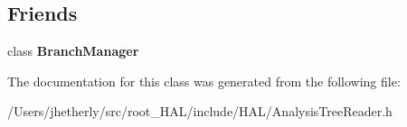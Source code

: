 \subsection*{Friends}
\begin{DoxyCompactItemize}
\item 
\hypertarget{class_h_a_l_1_1_analysis_tree_reader_a3b527c540b6431b5700a6d002214747c}{class {\bfseries Branch\-Manager}}\label{class_h_a_l_1_1_analysis_tree_reader_a3b527c540b6431b5700a6d002214747c}

\end{DoxyCompactItemize}


The documentation for this class was generated from the following file\-:\begin{DoxyCompactItemize}
\item 
/\-Users/jhetherly/src/root\-\_\-\-H\-A\-L/include/\-H\-A\-L/Analysis\-Tree\-Reader.\-h\end{DoxyCompactItemize}
